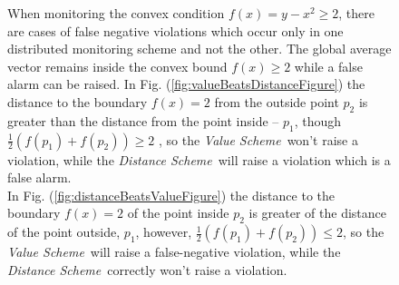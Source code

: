 \documentclass[10pt, conference]{IEEEtran}
\newcommand{\valueScheme}{\textit{Value Scheme}}
\newcommand{\distanceScheme}{\textit{Distance Scheme}}
\begin{document}
\begin{figure}[t]
\small
When monitoring the convex condition ${f(x) = y - x^2  \geq 2}$, there are cases of false negative violations which occur only in one distributed monitoring scheme and not the other. The global average vector remains inside the convex bound ${f(x) \geq 2}$ while a false alarm can be raised. In Fig. (\ref{fig:valueBeatsDistanceFigure}) the distance to the boundary $f(x) = 2$ from the outside point $p_2$ is greater than the distance from the point inside -- $p_1$, though ${\frac{1}{2}(f(p_1)+f(p_2))\geq 2}$ , so the \valueScheme \ won't raise a violation, while the \distanceScheme \ will raise a violation which is a false alarm. \\
In Fig. (\ref{fig:distanceBeatsValueFigure}) the distance to the boundary $f(x) = 2$ of the point inside $p_2$ is greater of the distance of the point outside, $p_1$, however, ${\frac{1}{2}(f(p_1)+f(p_2))\leq 2}$, so the \valueScheme \ will raise a false-negative violation, while the \distanceScheme \ correctly won't raise a violation.
\end{figure}
\end{document}
